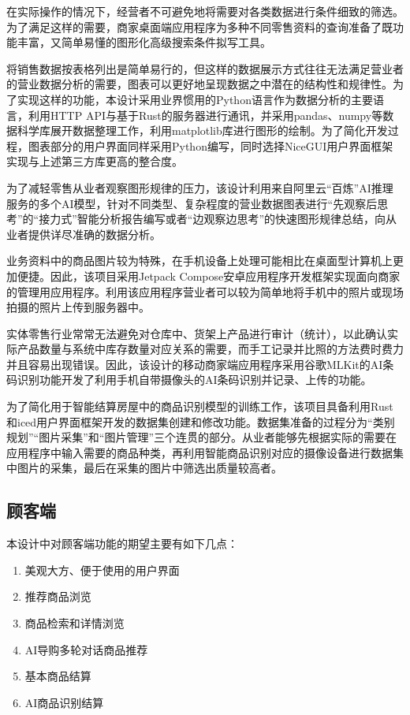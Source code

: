 在实际操作的情况下，经营者不可避免地将需要对各类数据进行条件细致的筛选。为了满足这样的需要，商家桌面端应用程序为多种不同零售资料的查询准备了既功能丰富，又简单易懂的图形化高级搜索条件拟写工具。

将销售数据按表格列出是简单易行的，但这样的数据展示方式往往无法满足营业者的营业数据分析的需要，图表可以更好地呈现数据之中潜在的结构性和规律性。为了实现这样的功能，本设计采用业界惯用的Python语言作为数据分析的主要语言，利用HTTP API与基于Rust的服务器进行通讯，并采用pandas、numpy等数据科学库展开数据整理工作，利用matplotlib库进行图形的绘制。为了简化开发过程，图表部分的用户界面同样采用Python编写，同时选择NiceGUI用户界面框架实现与上述第三方库更高的整合度。

为了减轻零售从业者观察图形规律的压力，该设计利用来自阿里云“百炼”AI推理服务的多个AI模型，针对不同类型、复杂程度的营业数据图表进行“先观察后思考”的“接力式”智能分析报告编写或者“边观察边思考”的快速图形规律总结，向从业者提供详尽准确的数据分析。

业务资料中的商品图片较为特殊，在手机设备上处理可能相比在桌面型计算机上更加便捷。因此，该项目采用Jetpack Compose安卓应用程序开发框架实现面向商家的管理用应用程序。利用该应用程序营业者可以较为简单地将手机中的照片或现场拍摄的照片上传到服务器中。

实体零售行业常常无法避免对仓库中、货架上产品进行审计（统计），以此确认实际产品数量与系统中库存数量对应关系的需要，而手工记录并比照的方法费时费力并且容易出现错误。因此，该设计的移动商家端应用程序采用谷歌MLKit的AI条码识别功能开发了利用手机自带摄像头的AI条码识别并记录、上传的功能。

为了简化用于智能结算房屋中的商品识别模型的训练工作，该项目具备利用Rust和iced用户界面框架开发的数据集创建和修改功能。数据集准备的过程分为“类别规划”“图片采集”和“图片管理”三个连贯的部分。从业者能够先根据实际的需要在应用程序中输入需要的商品种类，再利用智能商品识别对应的摄像设备进行数据集中图片的采集，最后在采集的图片中筛选出质量较高者。

\subsection{顾客端}

本设计中对顾客端功能的期望主要有如下几点：

\begin{enumerate}
    \item 美观大方、便于使用的用户界面
    \item 推荐商品浏览
    \item 商品检索和详情浏览
    \item AI导购多轮对话商品推荐
    \item 基本商品结算
    \item AI商品识别结算
\end{enumerate}

